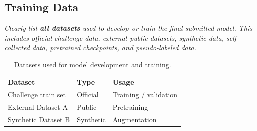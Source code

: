 \documentclass[letterpaper,10pt,conference]{ieeeconf}
\newcommand{\instruction}[1]{\textcolor{instructionblue}{\textit{#1}}}
\begin{document}
\subsection{Training Data}

\instruction{
Clearly list \textbf{all datasets} used to develop or train the final submitted model.
This includes official challenge data, external public datasets, synthetic data,
self-collected data, pretrained checkpoints, and pseudo-labeled data.
}

\begin{table}[htbp]
    \centering
    \footnotesize
    \caption{Datasets used for model development and training.}
    \begin{tabular}{p{2.3cm} p{1.6cm} p{2.8cm}}
        \toprule
        Dataset & Type & Usage \\
        \midrule
        Challenge train set & Official & Training / validation \\
        External Dataset A & Public & Pretraining \\
        Synthetic Dataset B & Synthetic & Augmentation \\
        \bottomrule
    \end{tabular}
    
    \label{tab:datasets}
    
\end{table}


\end{document}
